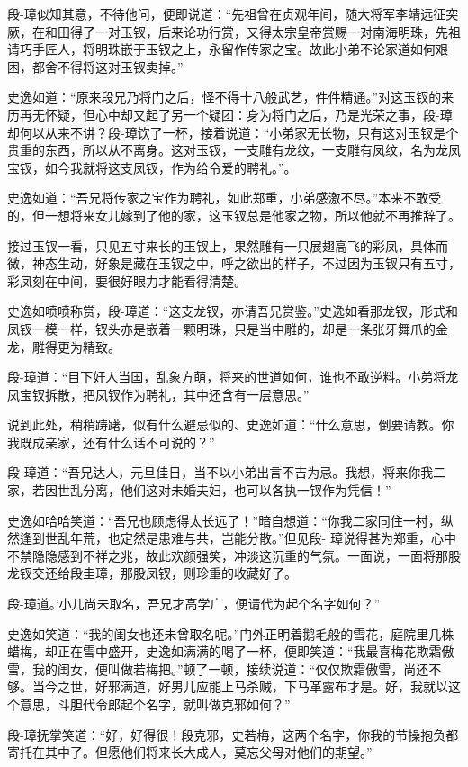 \documentclass[12pt,oneside]{book}
\begin{document}
段-璋似知其意，不待他问，便即说道：``先祖曾在贞观年间，随大将军李靖远征突厥，在和田得了一对玉钗，后来论功行赏，又得太宗皇帝赏赐一对南海明珠，先祖请巧手匠人，将明珠嵌于玉钗之上，永留作传家之宝。故此小弟不论家道如何艰困，都舍不得将这对玉钗卖掉。''

史逸如道：``原来段兄乃将门之后，怪不得十八般武艺，件件精通。''对这玉钗的来历再无怀疑，但心中却又起了另一个疑团：身为将门之后，乃是光荣之事，段-璋却何以从来不讲？段-璋饮了一杯，接着说道：``小弟家无长物，只有这对玉钗是个贵重的东西，所以从不离身。这对玉钗，一支雕有龙纹，一支雕有凤纹，名为龙凤宝钗，如今我就将这支凤钗，作为给令爱的聘礼。''。

史逸如道：``吾兄将传家之宝作为聘礼，如此郑重，小弟感激不尽。''本来不敢受的，但一想将来女儿嫁到了他的家，这玉钗总是他家之物，所以他就不再推辞了。

接过玉钗一看，只见五寸来长的玉钗上，果然雕有一只展翅高飞的彩凤，具体而微，神态生动，好象是藏在玉钗之中，呼之欲出的样子，不过因为玉钗只有五寸，彩凤刻在中间，要很好眼力才能看得清楚。

史逸如喷喷称赏，段-璋道：``这支龙钗，亦请吾兄赏鉴。''史逸如看那龙钗，形式和凤钗一模一样，钗头亦是嵌着一颗明珠，只是当中雕的，却是一条张牙舞爪的金龙，雕得更为精致。

段-璋道：``目下奸人当国，乱象方萌，将来的世道如何，谁也不敢逆料。小弟将龙凤宝钗拆散，把凤钗作为聘礼，其中还含有一层意思。''

说到此处，稍稍踌躇，似有什么避忌似的、史逸如道：``什么意思，倒要请教。你我既成亲家，还有什么话不可说的？''

段-璋道：``吾兄达人，元旦佳日，当不以小弟出言不吉为忌。我想，将来你我二家，若因世乱分离，他们这对未婚夫妇，也可以各执一钗作为凭信！''

史逸如哈哈笑道：``吾兄也顾虑得太长远了！''暗自想道：``你我二家同住一村，纵然逢到世乱年荒，也定然是患难与共，岂能分散。''但见段-
璋说得甚为郑重，心中不禁隐隐感到不祥之兆，故此欢颜强笑，冲淡这沉重的气氛。一面说，一面将那股龙钗交还给段圭璋，那股凤钗，则珍重的收藏好了。

段-璋道。'小儿尚未取名，吾兄才高学广，便请代为起个名字如何？''

史逸如笑道：``我的闺女也还未曾取名呢。''门外正明着鹅毛般的雪花，庭院里几株蜡梅，却正在雪中盛开，史逸如满满的喝了一杯，便即笑道：``我最喜梅花欺霜傲雪，我的闺女，便叫做若梅把。''顿了一顿，接续说道：``仅仅欺霜傲雪，尚还不够。当今之世，好邪满道，好男儿应能上马杀贼，下马革露布才是。好，我就以这个意思，斗胆代令郎起个名字，就叫做克邪如何？''

段-璋抚掌笑道：``好，好得很！段克邪，史若梅，这两个名字，你我的节操抱负都寄托在其中了。但愿他们将来长大成人，莫忘父母对他们的期望。''
\end{document}
